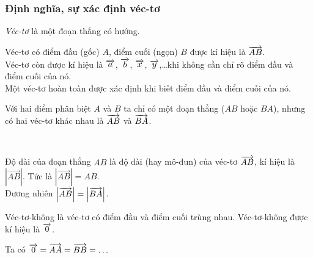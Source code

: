 \subsubsection{Định nghĩa, sự xác định véc-tơ}
\begin{dn}[Véc-tơ]
\textit{Véc-tơ} là một đoạn thẳng có hướng.
\end{dn}
\begin{minipage}{0.65\textwidth}Véc-tơ có điểm đầu (gốc) $A$, điểm cuối (ngọn) $B$ được kí hiệu là $\protect\overrightarrow{AB}$.\\
Véc-tơ còn được kí hiệu là $\protect\overrightarrow{a}$, $\protect\overrightarrow{b}$, $\protect\overrightarrow{x}$, $\protect\overrightarrow{y}$,\ldots khi không cần chỉ rõ điểm đầu và điểm cuối của nó.\\
Một véc-tơ hoàn toàn được xác định khi biết điểm đầu và điểm cuối của nó.\\
\begin{note}
Với hai điểm phân biệt $A$ và $B$ ta chỉ có một đoạn thẳng ($AB$ hoặc $BA$), nhưng có hai véc-tơ khác nhau là $\protect\overrightarrow{AB}$ và $\protect\overrightarrow{BA}$.
\end{note}\end{minipage}\hspace*{10pt}
\begin{minipage}{0.3\textwidth}\end{minipage}\\
\begin{dn}
Độ dài của đoạn thẳng $AB$ là độ dài (hay mô-đun) của véc-tơ $\protect\overrightarrow{AB}$, kí hiệu là $\left|\overrightarrow{AB}\right|$.
Tức là $\left|\overrightarrow{AB}\right|=AB$.\\
Đương nhiên $\left|\protect\overrightarrow{AB}\right|=\left|\protect\overrightarrow{BA}\right|$.
\end{dn}
\begin{dn}
Véc-tơ-không là véc-tơ có điểm đầu và điểm cuối trùng nhau. Véc-tơ-không được kí hiệu là $\protect\overrightarrow{0}$.
\end{dn}
Ta có $\protect\overrightarrow{0}=\protect\overrightarrow{AA}=\protect\overrightarrow{BB}=\ldots$

